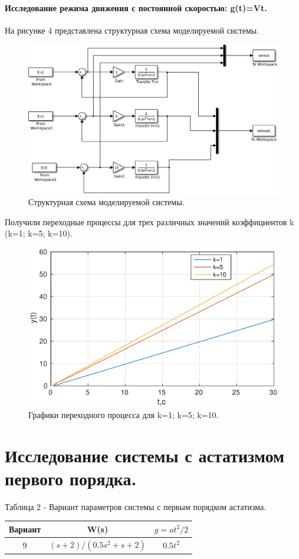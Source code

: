 \documentclass[a4paper,14pt]{article}
\begin{document}
\paragraph{Исследование режима движения с постоянной скоростью: g(t)=Vt.}
На рисунке 4 представлена структурная схема моделируемой системы.
\begin{figure}[H]
\centering
\includegraphics[width=\textwidth]{1/1_2.eps}
\caption{Структурная схема моделируемой  системы.}
\end{figure}

Получили переходные процессы для трех различных значений коэффициентов k (k=1; k=5; k=10).
\begin{figure}[H]
\centering
\includegraphics[width=\textwidth]{1/1_2y(t).eps}
\caption{Графики переходного процесса для k=1; k=5; k=10.}
\end{figure}

\newpage
\section {Исследование системы с астатизмом первого порядка.}
Таблица 2 - Вариант параметров системы с первым порядком астатизма. 
\begin{center}
\begin{tabular}{ |c|c|c| } 
 \hline
 Вариант & W(s) & $g=at^2/2$  \\ 
 \hline
 9 & $ (s+2)/(0.5s^2+s+2) $ & $0.5t^2$  \\ 
 \hline
\end{tabular}
\end{center}
\end{document}
